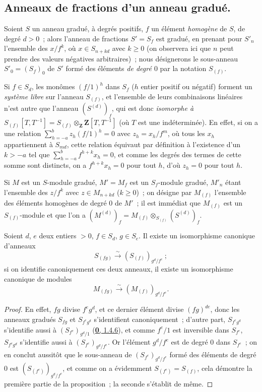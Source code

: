 \subsection{Anneaux de fractions d'un anneau gradué.}
\label{subsection:II.2.2-fr}

\begin{env}[2.2.1]
\label{II.2.2.1-fr}
Soient $S$ un anneau gradué, à degrés positifs, $f$ un élément
\emph{homogène} de $S$, de degré $d>0$~; alors l'anneau de fractions
$S'=S_f$ est gradué, en prenant pour $S'_n$ l'ensemble des $x/f^k$, où
$x\in S_{n+kd}$ avec $k\geq 0$ (on observera ici que $n$ peut prendre des
valeurs négatives arbitraires)~; nous désignerons le sous-anneau
$S'_0=(S_f)_0$ de $S'$ formé des éléments \emph{de degré $0$} par la
notation $S_{(f)}$.

Si $f\in S_d$, les monômes $(f/1)^h$ dans $S_f$ ($h$ entier positif ou
négatif) forment un \emph{système libre} sur l'anneau $S_{(f)}$, et
l'ensemble de leurs combinaisons linéaires n'est autre que
l'anneau $(S^{(d)})_f$, qui est donc \emph{isomorphe à
$S_{(f)}[T,T^{-1}]=S_{(f)}\otimes_{\mathbf{Z}}\mathbf{Z}[T,T^{-1}]$}
(où $T$ est une indéterminée). En effet, si on a une relation
$\sum_{h=-a}^{b}z_h(f/1)^h=0$ avec $z_h=x_h/f^m$, où tous les $x_h$
appartiennent à $S_{md}$, cette relation équivaut par définition à
l'existence d'un $k>-a$ tel que
$\sum_{h=-a}^{b}f^{h+k}x_h=0$, et comme les degrés des termes de cette somme
sont distincts, on a $f^{h+k}x_h=0$ pour tout $h$, d'où $z_h=0$ pour tout
$h$.

Si $M$ est un $S$-module gradué, $M'=M_f$ est un $S_f$-module gradué,
$M'_n$ étant l'ensemble des $z/f^k$ avec $z\in M_{n+kd}$ ($k\geq 0$)~; on
désigne par $M_{(f)}$ l'ensemble des éléments homogènes de degré $0$ de
$M'$~; il est immédiat que $M_{(f)}$ est un $S_{(f)}$-module et que l'on a
$(M^{(d)})_f=M_{(f)}\otimes_{S_{(f)}}(S^{(d)})_f$.
\end{env}

\begin{lemma}[2.2.2]
\label{II.2.2.2-fr}
Soient $d$, $e$ deux entiers $>0$, $f\in S_d$, $g\in S_e$. Il existe un
isomorphisme canonique d'anneaux
\[
  S_{(fg)}\xrightarrow{\sim}(S_{(f)})_{g^d/f^e}~;
\]
si on identifie canoniquement ces deux anneaux, il existe un isomorphisme
canonique de modules
\[
  M_{(fg)}\xrightarrow{\sim}(M_{(f)})_{g^d/f^e}.
\]
\end{lemma}

\begin{proof}
En effet, $fg$ divise $f^e g^d$, et ce dernier élément divise $(fg)^{de}$,
donc les anneaux gradués $S_{fg}$ et $S_{f^e g^d}$ s'identifient
canoniquement~; d'autre part, $S_{f^e g^d}$ s'identifie aussi à
$(S_{f^e})_{g^d/1}$ (\hyperref[0.1.4.6-fr]{\textbf{0}, 1.4.6}), et comme $f^e/1$ est
inversible dans $S_{f^e}$, $S_{f^e g^d}$ s'identifie aussi à
$(S_{f^e})_{g^d/f^e}$. Or l'élément $g^d/f^e$ est de degré $0$ dans
$S_{f^e}$~; on en conclut aussitôt que le sous-anneau de
$(S_{f^e})_{g^d/f^e}$ formé des éléments de degré $0$ est
$(S_{(f^e)})_{g^d/f^e}$, et comme on a évidemment
$S_{(f^e)}=S_{(f)}$, cela démontre la première partie de la proposition~;
la seconde s'établit de même.
\end{proof}

